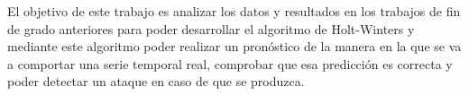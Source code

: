 El objetivo de este trabajo es analizar los datos y resultados en los trabajos de fin de grado anteriores para poder desarrollar el algoritmo de Holt-Winters y mediante este algoritmo poder realizar un pronóstico de la manera en la que se va a comportar una serie temporal real, comprobar que esa predicción es correcta y poder detectar un ataque en caso de que se produzca.

